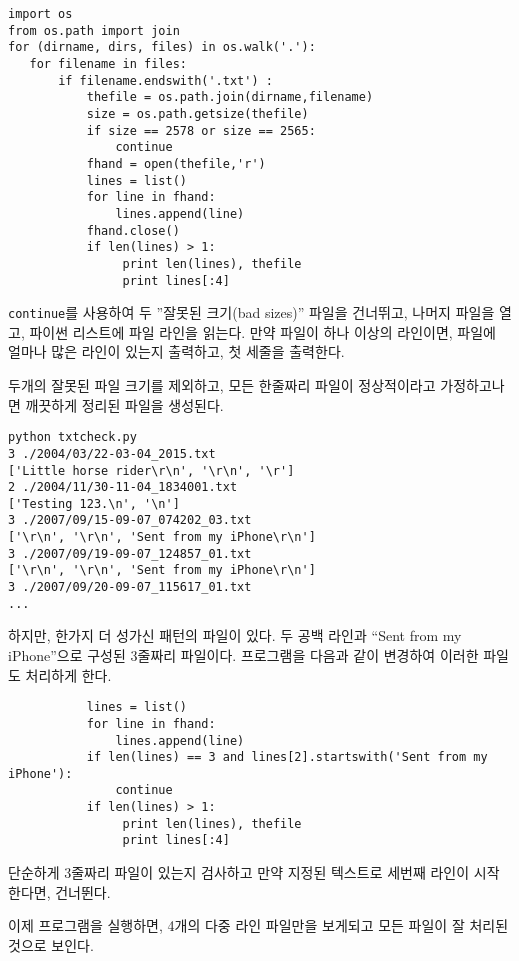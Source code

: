 \beforeverb
\begin{verbatim}
import os
from os.path import join
for (dirname, dirs, files) in os.walk('.'):
   for filename in files:
       if filename.endswith('.txt') :
           thefile = os.path.join(dirname,filename)
           size = os.path.getsize(thefile)
           if size == 2578 or size == 2565:
               continue
           fhand = open(thefile,'r')
           lines = list()
           for line in fhand:
               lines.append(line)
           fhand.close()
           if len(lines) > 1:
                print len(lines), thefile
                print lines[:4]
\end{verbatim}
\afterverb
%

{\tt continue}를 사용하여 두 ''잘못된 크기(bad sizes)'' 파일을 건너뛰고, 
나머지 파일을 열고, 파이썬 리스트에 파일 라인을 읽는다.
만약 파일이 하나 이상의 라인이면, 파일에 얼마나 많은 라인이 있는지 출력하고,
첫 세줄을 출력한다.

두개의 잘못된 파일 크기를 제외하고, 모든 한줄짜리 파일이 정상적이라고 가정하고나면
깨끗하게 정리된 파일을 생성된다.

\beforeverb
\begin{verbatim}
python txtcheck.py 
3 ./2004/03/22-03-04_2015.txt
['Little horse rider\r\n', '\r\n', '\r']
2 ./2004/11/30-11-04_1834001.txt
['Testing 123.\n', '\n']
3 ./2007/09/15-09-07_074202_03.txt
['\r\n', '\r\n', 'Sent from my iPhone\r\n']
3 ./2007/09/19-09-07_124857_01.txt
['\r\n', '\r\n', 'Sent from my iPhone\r\n']
3 ./2007/09/20-09-07_115617_01.txt
...
\end{verbatim}
\afterverb
%

하지만, 한가지 더 성가신 패턴의 파일이 있다. 두 공백 라인과 ``Sent from my iPhone''으로 구성된 3줄짜리 파일이다.
프로그램을 다음과 같이 변경하여 이러한 파일도 처리하게 한다.

\beforeverb
\begin{verbatim}
           lines = list()
           for line in fhand:
               lines.append(line)
           if len(lines) == 3 and lines[2].startswith('Sent from my iPhone'):
               continue
           if len(lines) > 1:
                print len(lines), thefile
                print lines[:4]
\end{verbatim}
\afterverb
%

단순하게 3줄짜리 파일이 있는지 검사하고 만약 지정된 텍스트로 세번째 라인이 시작한다면, 건너뛴다.

이제 프로그램을 실행하면, 4개의 다중 라인 파일만을 보게되고 모든 파일이 잘 처리된 것으로 보인다.

